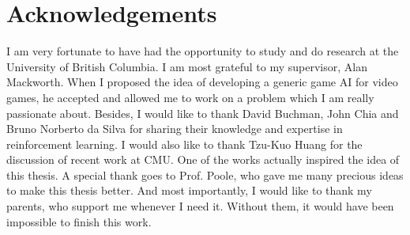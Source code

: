 
\chapter{Acknowledgements}

I am very fortunate to have had the opportunity to study and do research at
the University of British Columbia. I am most grateful to my supervisor, Alan Mackworth.
When I proposed the idea of developing a generic game AI for video games, he
accepted and allowed me to work on a problem which I am really passionate about.
Besides, I would like to thank David Buchman, John Chia and Bruno Norberto da Silva
for sharing their knowledge and expertise in reinforcement learning.
I would also like to thank Tzu-Kuo Huang for
the discussion of recent work at CMU. One of the works actually inspired
the idea of this thesis.
A special thank goes to Prof. Poole, who gave me many precious ideas to make this
thesis better.
And most importantly, I would like to thank my parents, who support
me whenever I need it. Without them, it would have been impossible to finish this work.




